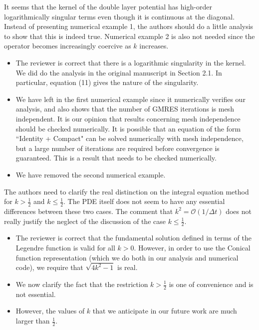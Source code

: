 \documentclass[11pt]{article}
\newcommand{\comment}[1]{{\color{blue} #1}}
\begin{document}
\comment{It seems that the kernel of the double layer potential has
high-order logarithmically singular terms even though it is continuous
at the diagonal. Instead of presenting numerical example 1, the authors
should do a little analysis to show that this is indeed true.
Numerical example 2 is also not needed since the operator becomes
increasingly coercive as $k$ increases.}
\begin{itemize}
  \item The reviewer is correct that there is a logarithmic singularity
  in the kernel.  We did do the analysis in the original manuscript in
  Section 2.1.  In particular, equation (11) gives the nature of the
  singularity.
  \item We have left in the first numerical example since it numerically
  verifies our analysis, and also shows that the number of GMRES
  iterations is mesh independent.  It is our opinion that results
  concerning mesh independence should be checked numerically.  It is
  possible that an equation of the form ``Identity + Compact" can be
  solved numerically with mesh independence, but a large number of
  iterations are required before convergence is guaranteed.  This is a
  result that needs to be checked numerically.
  \item We have removed the second numerical example.
\end{itemize}

\comment{The authors need to clarify the real distinction on the
integral equation method for $k > \frac{1}{2}$ and $k \leq
\frac{1}{2}$.  The PDE itself does not seem to have any essential
differences between these two cases. The comment that $k^{2} =
\mathcal{O}(1/\Delta t)$ does not really justify the neglect of the
discussion of the case $k\leq\frac{1}{2}.$}
\begin{itemize}
  \item The reviewer is correct that the fundamental solution defined in
  terms of the Legendre function is valid for all $k > 0$.  However, in
  order to use the Conical function representation (which we do both in
  our analysis and numerical code), we require that $\sqrt{4k^{2}-1}$ is
  real.
  \item We now clarify the fact that the restriction $k > \frac{1}{2}$
  is one of convenience and is not essential.
  \item However, the values of $k$ that we anticipate in our future work
  are much larger than $\frac{1}{2}$.
\end{itemize}
\end{document}
